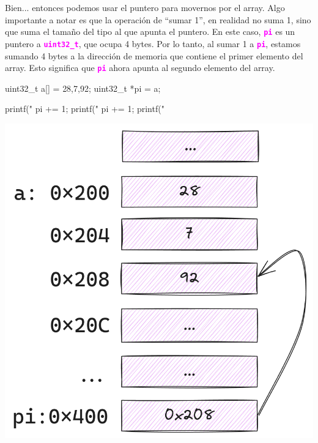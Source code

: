 \documentclass[]{scrartcl}
\newcommand{\hl}[1]{\textcolor{magenta}{\textbf{\texttt{#1}}}}
\begin{document}
\vspace {1 cm}

Bien... entonces podemos usar el puntero para movernos por el array. Algo importante a notar es que la operación de ``sumar 1'', en realidad no suma 1, sino que suma el tamaño del tipo al que apunta el puntero. En este caso, \hl{pi} es un puntero a \hl{uint32\_t}, que ocupa 4 bytes. Por lo tanto, al sumar 1 a \hl{pi}, estamos sumando 4 bytes a la dirección de memoria que contiene el primer elemento del array. Esto significa que \hl{pi} ahora apunta al segundo elemento del array.

\vspace {0.5cm}

\noindent
\begin{minipage}[t]{0.52\textwidth}
  \begin{cbox}[]{}
    uint32_t a[] = {28,7,92};
    uint32_t *pi = a;
    
    printf("%
    pi += 1;
    printf("%
    pi += 1;
    printf("%
    
  \end{cbox}
\end{minipage}
\hfill
\begin{minipage}[t]{0.45\textwidth}
  \includegraphics[width=\linewidth]{img/pointers_arith.03.png}
\end{minipage}
\vspace {0.5cm}
\end{document}

